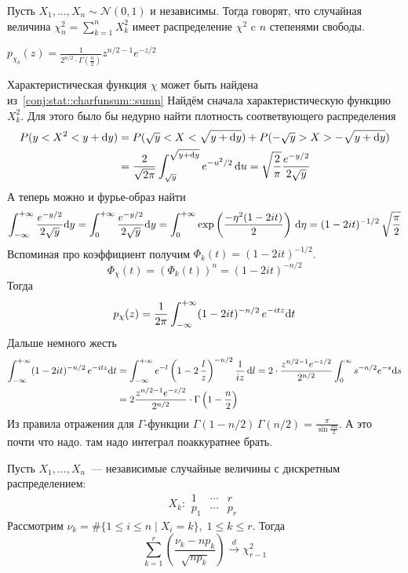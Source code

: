 \documentclass[12pt,timbord]{../../../notes}
\begin{document}
\begin{defn}\label{defn:stat::genmuavr::chi}
  Пусть $X_1, \dotsc, X_n \sim \mathcal N (0,1)$ и независимы. Тогда говорят, что случайная
  величина $\displaystyle \chi_n^2 = \sum_{k=1}^n X_k^2$ имеет распределение $\chi^2$ c $n$
  степенями свободы.
\end{defn}
\begin{prop}\label{prop:stat::genmuavr::chi}
  $\displaystyle p_{\chi_b}(z) = \frac{1}{2^{n/2}\cdot \Gamma (\frac{n}{2} )} z^{n/2 -1} e^{-z/2} $
\end{prop}
\begin{itlproof}
  Характеристическая функция $\chi$ может быть найдена из~\ref{conj:stat::charfunsum::sumn}
  Найдём сначала характеристическую функцию $X_k^2$. Для этого было бы недурно найти плотность
  соответвующего распределения
  \[
    \begin{split}
      P(y < X^2 < y+ \mathrm{d} y) &= P(\sqrt y < X < \sqrt{y + \mathrm{d} y})+ P(-\sqrt y>X >-\sqrt{y+\mathrm{d} y})
      \\
      &= \frac{2}{\sqrt{2\pi}}  \int_{\sqrt y}^{\sqrt{y+\mathrm{d} y}} e^{-u^2/2} \, \mathrm{d} u 
      = \sqrt{\frac{2}{\pi} } \frac{e^{-y/2}}{2\sqrt y} 
    \end{split}
  \]
  А теперь можно и фурье-образ найти
  \[
    \int_{-\infty}^{+\infty}\frac{e^{-y/2}}{2\sqrt y}\mathrm{d} y = \int_{0}^{+\infty}\frac{e^{-y/2}}{2\sqrt y}\mathrm{d} y
    = \int_{0}^{+\infty} \exp\left(\frac{-\eta^2(1-2it)}{2}\right)\,\mathrm{d}\eta
    = (1-2it)^{-1/2} \, \sqrt{\frac\pi 2}
  \]
  Вспоминая про коэффициент получим $\Phi_k(t) = (1-2it)^{-1/2}$.
  \[
    \Phi_\chi(t) = \left(\Phi_k(t)\right)^n =  (1-2it)^{-n/2}
  \]
  Тогда \[
    p_\chi(z) = \frac{1}{2\pi} \int_{-\infty}^{+\infty} (1-2it)^{-n/2}\, e^{-itz}\mathrm{d} t
  \]
  Дальше немного жесть
  \begin{align*}
    \int_{-\infty}^{+\infty} (1-2it)^{-n/2}\, e^{-itz}\mathrm{d} t &= \int_{-\infty}^{+\infty} e^{-l} \left(1-2\, \frac{l}{z} \right)^{-n/2}
    \frac{1}{iz} \, \mathrm{d} l 
    = 2\cdot\frac{z^{n/2-1} e^{-z/2}}{2^{n/2}} \int_{0}^{\infty} s^{-n/2} e^{-s} \mathrm{d} s \\
    &= 2\frac{z^{n/2-1} e^{-z/2}}{2^{n/2}} \cdot \Gamma\left(1-\frac{n}{2} \right)
  \end{align*}
  Из правила отражения для $\Gamma$-функции 
  $\Gamma(1-n/2)\, \Gamma(n/2) = \frac{\pi}{\sin\frac{\pi n}{2} } $. А это почти что надо.
  \underdev
  там надо интеграл поаккуратнее брать.
\end{itlproof}

\begin{thrm}\label{thrm:stat::genmuavr}
  Пусть $X_1, \dotsc, X_n$~--- независимые случайные величины с дискретным распределением:
  \[
    X_k \colon
    \begin{array}{c|c|c}
      1 & \cdots & r \\ \hline
      p_1 & \cdots & p_r
    \end{array}
  \]
  Рассмотрим $\nu_k = \# \{ 1 \leqslant i \leqslant n \mid X_i =k\},\; 1\leqslant k \leqslant r$.
  Тогда 
  \[
    \sum_{k=1}^r \left( \frac{\nu_k - n p_k}{\sqrt{n p_k}}  \right) \xrightarrow{d} \chi_{r-1}^2
  \]
\end{thrm}
\end{document}
